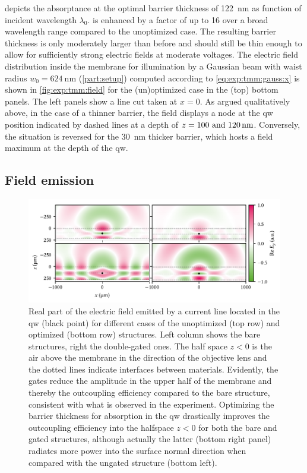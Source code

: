  depicts the absorptance at the optimal barrier thickness of \qty{122}{\nano\meter} as function of incident wavelength $\lambda_0$.
\absorptance is enhanced by a factor of up to \num{16} over a broad wavelength range compared to the unoptimized case.
The resulting barrier thickness is only moderately larger than before and should still be thin enough to allow for sufficiently strong electric fields at moderate voltages.
The electric field distribution inside the membrane for illumination by a Gaussian beam with waist radius $w_0 = \qty{624}{\nano\meter}$ (\cref{part:setup}) computed according to \cref{eq:exp:tmm:gauss:x} is shown in \cref{fig:exp:tmm:field} for the (un)optimized case in the (top) bottom panels.
The left panels show a line cut taken at $x=0$.
As argued qualitatively above, in the case of a thinner barrier, the field displays a node at the \gls{qw} position indicated by dashed lines at a depth of $z=\qtylist[list-units = single]{100;120}{\nano\meter}$.
Conversely, the situation is reversed for the \qty{30}{\nano\meter} thicker barrier, which hosts a field maximum at the depth of the \gls{qw}.

\subsection{Field emission}\label{subsec:exp:tmm:green}
\begin{figure}
    \centering
    \includegraphics{img/pdf/experiment/tmm_green}
    \caption[]{
        Real part of the electric field emitted by a current line located in the \gls{qw} (black point) for different cases of the unoptimized (top row) and optimized (bottom row) structures.
        Left column shows the bare structures, right the double-gated ones.
        The half space $z<0$ is the air above the membrane in the direction of the objective lens and the dotted lines indicate interfaces between materials.
        Evidently, the gates reduce the amplitude in the upper half of the membrane and thereby the outcoupling efficiency compared to the bare structure, consistent with what is observed in the experiment.
        Optimizing the barrier thickness for absorption in the \gls{qw} drastically improves the outcoupling efficiency into the halfspace $z<0$ for both the bare and gated structures, although actually the latter (bottom right panel) radiates more power into the surface normal direction when compared with the ungated structure (bottom left).
    }
    \label{fig:exp:tmm:green}
\end{figure}

